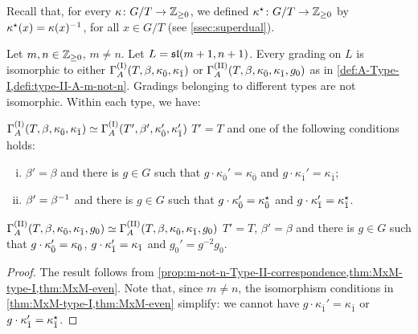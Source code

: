 Recall that, for every $\kappa\colon G/T \to \mathbb{Z}_{\geq 0}$, we defined $\kappa^\star\colon G/T \to \mathbb{Z}_{\geq 0}$ by $\kappa^\star(x) = \kappa(x)^{-1}$, for all $x \in G/T$ (see \cref{ssec:superdual}).

\begin{thm}\label{thm:final-m-not-n}
    Let $m,n \in \mathbb{Z}_{\geq 0}$, $m \neq n$. 
    Let $L = \mathfrak{sl}(m+1, n+1)$. 
    Every grading on $L$ is isomorphic to either $\Gamma_A^{\mathrm{(I)}}(T, \beta, \kappa_{\bar{0}}, \kappa_{\bar{1}})$ or $\Gamma_A^{\mathrm{(II)}}(T,\beta, \kappa_{\bar{0}}, \kappa_{\bar{1}}, g_0)$ as in \cref{def:A-Type-I,defi:type-II-A-m-not-n}. 
    Gradings belonging to different types are not isomorphic. 
    Within each type, we have:
    
    \noindent{}
    
    \noindent $\Gamma_A^{\mathrm{(I)}}(T, \beta, \kappa_{\bar{0}}, \kappa_{\bar{1}}) \simeq \Gamma_A^{\mathrm{(I)}}(T', \beta', \kappa_{\bar{0}}', \kappa_{\bar{1}}')$ \IFF  $T' = T$ and one of the following conditions holds:
	\begin{enumerate}[(i)]
	    \item $\beta'=\beta$ and there is $g\in G$ such that $g \cdot \kappa_{\bar 0}'=\kappa_{\bar 0}$ and $g \cdot \kappa_{\bar 1}'=\kappa_{\bar 1}$; 
	    \item $\beta'=\beta^{-1}$ and there is $g\in G$ such that $g \cdot \kappa_{\bar 0}'=\kappa_{\bar 0}^\star$ and $g \cdot \kappa_{\bar 1}'=\kappa_{\bar 1}^\star$.
	\end{enumerate}

    \noindent{}
    
    \noindent $\Gamma_A^{\mathrm{(II)}}(T,\beta, \kappa_{\bar{0}}, \kappa_{\bar{1}}, g_0) \simeq \Gamma_A^{\mathrm{(II)}}(T,\beta, \kappa_{\bar{0}}, \kappa_{\bar{1}}, g_0)$ \IFF
    $T' =T$, $\beta' = \beta$ and there is $g \in G$ such that $g\cdot\kappa_{\bar{0}}' = \kappa_{\bar{0}}$, $g\cdot\kappa_{\bar{1}}' = \kappa_{\bar{1}}$ and $g_0' = g^{-2}g_0$.
\end{thm}

\begin{proof}
    The result follows from \cref{prop:m-not-n-Type-II-correspondence,thm:MxM-type-I,thm:MxM-even}. 
    Note that, since $m \neq n$, the isomorphism conditions in \cref{thm:MxM-type-I,thm:MxM-even} simplify: we cannot have $g \cdot \kappa_{\bar 1}'=\kappa_{\bar 1}$ or $g \cdot \kappa_{\bar 1}'=\kappa_{\bar 1}^\star$. 
\end{proof}


